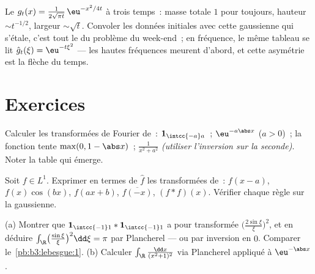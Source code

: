 \begin{omfigure}

{\small Le  $g_t(x) =
\frac1{2\sqrt{\pi t}}\,\eu^{-x^2/4t}$ à trois temps~: masse
totale $1$ pour toujours, hauteur $\sim t^{-1/2}$, largeur
$\sim \sqrt t$. Convoler les données initiales avec cette
gaussienne qui s'étale, c'est tout le  du problème du
week-end~; en fréquence, le même tableau se lit
$\hat g_t(\xi) = \eu^{-t\xi^2}$ --- les hautes fréquences
meurent d'abord, et cette asymétrie est la flèche du temps.}
\end{omfigure}

\section{Exercices}

\begin{exercise}[$\star$]\label{exo:b3:fouriertransform:1}
Calculer les transformées de Fourier de~: $\mathbf
1_{\intcc{-a}a}$~; $\eu^{-a\abs x}$ ($a > 0$)~; la fonction
tente $\max(0, 1 - \abs x)$~; $\frac1{x^2 + a^2}$
\emph{(utiliser l'inversion sur la seconde)}. Noter la table
qui émerge.
\end{exercise}

\begin{exercise}[$\star$]\label{exo:b3:fouriertransform:2}
Soit $f \in L^1$. Exprimer en termes de $\hat f$ les
transformées de~: $f(x - a)$, $f(x)\cos(bx)$, $f(ax + b)$,
$\overline{f(-x)}$, $(f * f)(x)$. Vérifier chaque règle sur
la gaussienne.
\end{exercise}

\begin{exercise}[$\star\star$]\label{exo:b3:fouriertransform:3}
(a) Montrer que $\mathbf 1_{\intcc{-1}1} * \mathbf
1_{\intcc{-1}1}$ a pour transformée
$\bigl(\frac{2\sin\xi}\xi\bigr)^2$, et en déduire
$\int_\R\bigl(\frac{\sin\xi}\xi\bigr)^2\dd\xi = \pi$ par
Plancherel --- ou par inversion en $0$. Comparer
le~\cref{pb:b3:lebesgue:1}.
(b) Calculer $\int_\R\frac{\dd x}{(x^2+1)^2}$ via Plancherel
appliqué à $\eu^{-\abs x}$.
\end{exercise}

